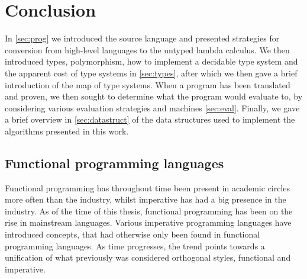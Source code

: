 \chapter{Conclusion}
In \autoref{sec:prog} we introduced the source language and presented strategies for conversion from high-level languages to the untyped lambda calculus. 
We then introduced types, polymorphism, how to implement a decidable type system and the apparent cost of type systems in \autoref{sec:types}, after which we then gave a brief introduction of the map of type systems.
When a program has been translated and proven, we then sought to determine what the program would evaluate to, by considering various evaluation strategies and machines \autoref{sec:eval}.
Finally, we gave a brief overview in \autoref{sec:datastruct} of the data structures used to implement the algorithms presented in this work.

\section{Functional programming languages}
Functional programming has throughout time been present in academic circles more often than the industry, whilst imperative has had a big presence in the industry.
As of the time of this thesis, functional programming has been on the rise in mainstream languages.
Various imperative programming languages have introduced concepts, that had otherwise only been found in functional programming languages.
As time progresses, the trend points towards a unification of what previously was considered orthogonal styles, functional and imperative.

